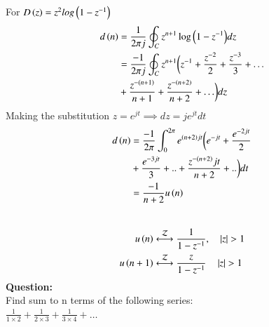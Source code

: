 \documentclass[journal,12pt,twocolumn]{IEEEtran}
\theoremstyle{remark}
\begin{document}
For $D\left(z\right)= z^{2}log\left(1-z^{-1}\right)$
\begin{align}
    d\left(n\right)&= \frac{1}{2\pi j} \oint _C z^{n+1}\log{\ensuremath{\left(1-z^{-1}\right)}}dz\\
    &=\frac{-1}{2\pi j} \oint _C z^{n+1}\biggl(z^{-1}+\frac{z^{-2}}{2} + \frac{z^{-3}}{3}+\ldots \notag\\ \;\: &+ \frac{z^{-(n+1)}}{n+1} +  \frac{z^{-\left(n+2\right)}}{n+2}+ \ldots \biggr) dz
\end{align}
Making the substitution $z=e^{jt} \implies dz = je^{jt}dt$
\begin{align}  
    d\left(n\right)&=\frac{-1}{2\pi} \int_{0}^{2\pi} e^{\left(n+2\right)jt}\biggl(e^{-jt}+\frac{e^{-2jt}}{2} \notag \\&+ \frac{e^{-3jt}}{3} +.. +\frac{z^{-\left(n+2\right)}jt}{n+2}+..\biggr) dt\\
    &=\frac{-1}{n+2} u\left(n\right)\label{11027_eq2}
\end{align}
\\
\begin{align}
	u\brak{n} &\system{Z} \frac{1}{1-z^{-1}} , \quad \abs{z} > 1\\
	u\brak{n+1} &\system{Z} \frac{z}{1-z^{-1}} \quad \abs{z} > 1 \label{Z_trans_pair}
\end{align}
\newpage
\textbf{Question:} \\
Find sum to n terms of the following series:\\
$\frac{1}{1 \times 2} + \frac{1}{2 \times 3} + \frac{1}{3 \times 4} + \ldots$
\bigskip \bigskip
\end{document}
